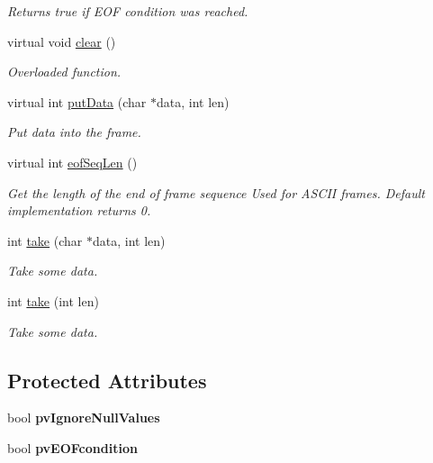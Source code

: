 \begin{DoxyCompactItemize}
\begin{DoxyCompactList}\small\item\em Returns true if EOF condition was reached. \end{DoxyCompactList}\item 
virtual void \hyperlink{classmdt_frame_acdf8a921a3f36ca91af88b55b90febdc}{clear} ()
\begin{DoxyCompactList}\small\item\em Overloaded function. \end{DoxyCompactList}\item 
virtual int \hyperlink{classmdt_frame_a51c355541b134e6e051167c70c09d531}{putData} (char $\ast$data, int len)
\begin{DoxyCompactList}\small\item\em Put data into the frame. \end{DoxyCompactList}\item 
\hypertarget{classmdt_frame_a0e0dcfb9d284ac0dae550db33f0fbece}{
virtual int \hyperlink{classmdt_frame_a0e0dcfb9d284ac0dae550db33f0fbece}{eofSeqLen} ()}
\label{classmdt_frame_a0e0dcfb9d284ac0dae550db33f0fbece}

\begin{DoxyCompactList}\small\item\em Get the length of the end of frame sequence Used for ASCII frames. Default implementation returns 0. \end{DoxyCompactList}\item 
int \hyperlink{classmdt_frame_a36e4b85a3c671902ac3c8cc318ca726c}{take} (char $\ast$data, int len)
\begin{DoxyCompactList}\small\item\em Take some data. \end{DoxyCompactList}\item 
int \hyperlink{classmdt_frame_ad8b184e6eb07a26fe84deaf233c1aa9b}{take} (int len)
\begin{DoxyCompactList}\small\item\em Take some data. \end{DoxyCompactList}\end{DoxyCompactItemize}
\subsection*{Protected Attributes}
\begin{DoxyCompactItemize}
\item 
\hypertarget{classmdt_frame_a883c4de8f2c961310366d5a72b6e6dd8}{
bool {\bfseries pvIgnoreNullValues}}
\label{classmdt_frame_a883c4de8f2c961310366d5a72b6e6dd8}

\item 
\hypertarget{classmdt_frame_a1862e197bad6e9887cfedc54a768e88d}{
bool {\bfseries pvEOFcondition}}
\label{classmdt_frame_a1862e197bad6e9887cfedc54a768e88d}

\end{DoxyCompactItemize}


